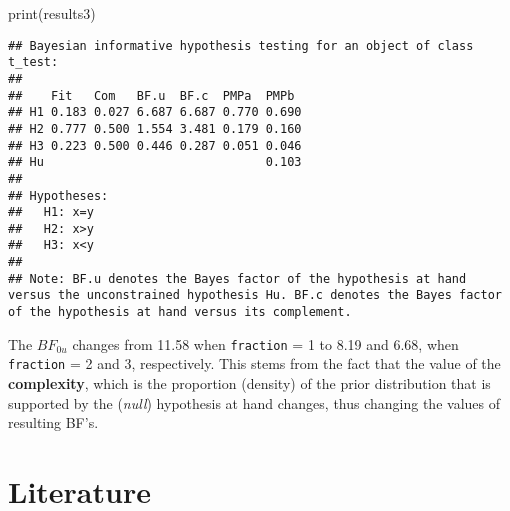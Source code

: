\documentclass[
]{book}
\newenvironment{Shaded}{\begin{snugshade}}{\end{snugshade}}
\newcommand{\FunctionTok}[1]{\textcolor[rgb]{0.00,0.00,0.00}{#1}}
\newcommand{\NormalTok}[1]{#1}
\begin{document}
\begin{Shaded}
\begin{Highlighting}[]
\FunctionTok{print}\NormalTok{(results3)}
\end{Highlighting}
\end{Shaded}

\begin{verbatim}
## Bayesian informative hypothesis testing for an object of class t_test:
## 
##    Fit   Com   BF.u  BF.c  PMPa  PMPb 
## H1 0.183 0.027 6.687 6.687 0.770 0.690
## H2 0.777 0.500 1.554 3.481 0.179 0.160
## H3 0.223 0.500 0.446 0.287 0.051 0.046
## Hu                               0.103
## 
## Hypotheses:
##   H1: x=y
##   H2: x>y
##   H3: x<y
## 
## Note: BF.u denotes the Bayes factor of the hypothesis at hand versus the unconstrained hypothesis Hu. BF.c denotes the Bayes factor of the hypothesis at hand versus its complement.
\end{verbatim}

The \(BF_{0u}\) changes from 11.58 when \texttt{fraction} = 1 to 8.19 and 6.68, when \texttt{fraction} = 2 and 3, respectively. This stems from the fact that the value of the \textbf{complexity}, which is the proportion (density) of the prior distribution that is supported by the (\emph{null}) hypothesis at hand changes, thus changing the values of resulting BF's.

\hypertarget{literature}{%
\chapter*{Literature}\label{literature}}
\end{document}
